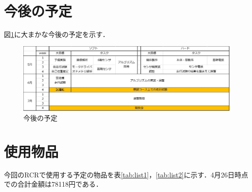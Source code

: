 \documentclass[10pt,a4j]{jarticle}
\begin{document}
\section{今後の予定}
図\ref{fig:schedule}に大まかな今後の予定を示す．
\begin{figure}[tH]
\begin{center}
  \includegraphics[width=1.0\hsize]{./picture/schedule.eps}
 \caption{今後の予定}
 \label{fig:schedule}
\end{center}
\end{figure}



\section{使用物品}
今回のRCRで使用する予定の物品を表\ref{tab:list1}，\ref{tab:list2}に示す．4月26日時点での合計金額は78118円である．


\newpage
\setcounter{page}{1}
\pagestyle{fancy}
\renewcommand{\headrulewidth}{0.0pt}
\lhead{}
\cfoot{}

\end{document}

